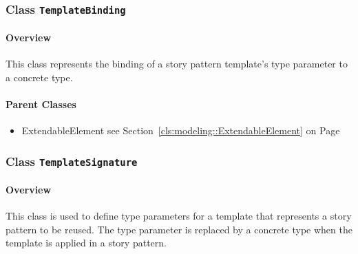\subsubsection{\Large{Class \bfseries \texttt{TemplateBinding}\normalfont}}
\label{cls:modeling::templates::TemplateBinding} 
\paragraph{Overview}

	
			
This class represents the binding of a story pattern template's type parameter to a concrete type.	
		
	



\paragraph{Parent Classes}
\begin{itemize}
\item ExtendableElement see Section~\ref{cls:modeling::ExtendableElement} on Page~\pageref{cls:modeling::ExtendableElement}\end{itemize}
\subsubsection{\Large{Class \bfseries \texttt{TemplateSignature}\normalfont}}
\label{cls:modeling::templates::TemplateSignature} 
\paragraph{Overview}

	
			
This class is used to define type parameters for a template that represents a story pattern to be reused. The type parameter is replaced by a concrete type when the template is applied in a story pattern.	
		
	



\newpage
		




